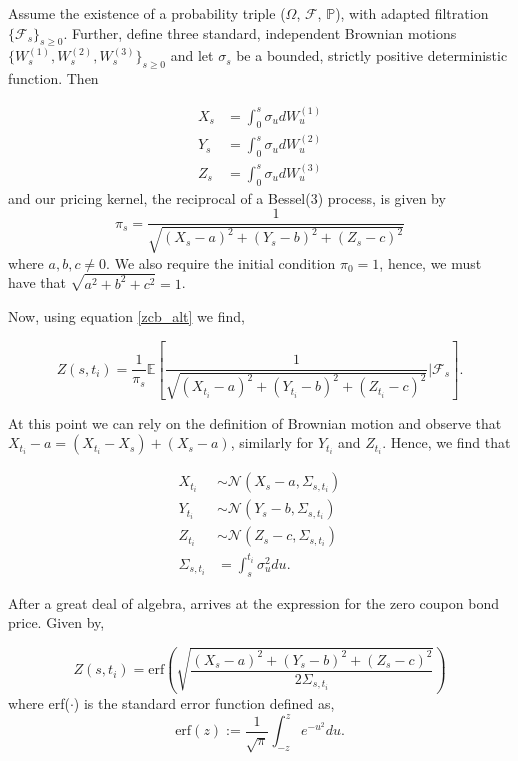 Assume the existence of a probability triple ($\Omega$, $\mathcal{F}$, $\mathbb{P}$), with adapted filtration $\{\mathcal{F}_s \}_{s \geq 0}$. Further, define three standard, independent Brownian motions $\{W_s^{(1)}, W_s^{(2)}, W_s^{(3)}\}_{s \geq 0}$ and let $\sigma_s$ be a bounded, strictly positive deterministic function. Then

\begin{align}
    X_s &= \int_0^s \sigma_u dW_u^{(1)} \\
    Y_s &= \int_0^s \sigma_u dW_u^{(2)} \\
    Z_s &= \int_0^s \sigma_u dW_u^{(3)}
\end{align}
and our pricing kernel, the reciprocal of a Bessel(3) process, is given by
\begin{equation}
    \pi_s = \frac{1}{\sqrt{(X_s - a)^2 + (Y_s - b)^2 + (Z_s - c)^2}}
\end{equation}
where $a, b, c \neq 0$. We also require the initial condition $\pi_0 = 1$, hence, we must have that $\sqrt{a^2 + b^2 + c^2} = 1$.

Now, using equation \ref{zcb_alt} we find,

\begin{equation}
    Z(s,t_i) = \frac{1}{\pi_s} \mathbb{E} \left[ \frac{1}{\sqrt{(X_{t_i} - a)^2 + (Y_{t_i} - b)^2 + (Z_{t_i} - c)^2}} \bigg \vert \mathcal{F}_s \right].
\end{equation}

At this point we can rely on the definition of Brownian motion and observe that $X_{t_i} - a = (X_{t_i} - X_s) + (X_s - a)$, similarly for $Y_{t_i}$ and $Z_{t_i}$. Hence, we find that

\begin{align}
    X_{t_i} &\sim \mathcal{N}(X_s - a, \Sigma_{s,t_i}) \\
    Y_{t_i} &\sim \mathcal{N}(Y_s - b, \Sigma_{s,t_i}) \\
    Z_{t_i} &\sim \mathcal{N}(Z_s - c, \Sigma_{s,t_i}) \\
    \Sigma_{s,t_i} &= \int_s^{t_i} \sigma_u^2 du.
\end{align}

After a great deal of algebra, \cite{brody2020theory} arrives at the expression for the zero coupon bond price. Given by,

\begin{equation}
    Z(s,t_i) = \text{erf} \left( \sqrt{ \frac{(X_s - a)^2 + (Y_s - b)^2 + (Z_s - c)^2}{2 \Sigma_{s,t_i}}} \right)
\end{equation}
where erf($\cdot$) is the standard error function defined as,
\begin{equation}
    \text{erf}(z) := \frac{1}{\sqrt{\pi}} \int_{-z}^{z} e^{-u^2} du.
\end{equation}


